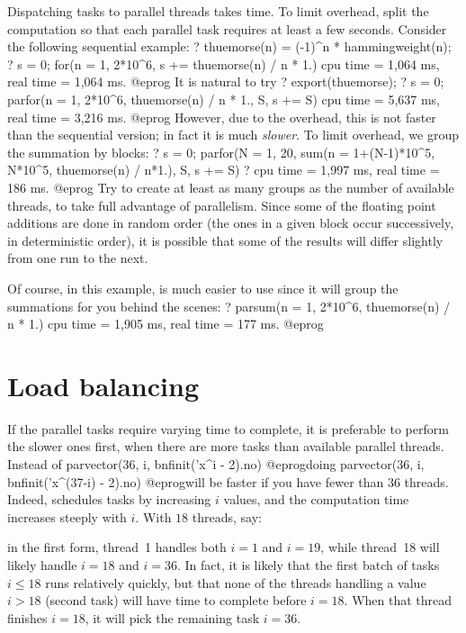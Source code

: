 Dispatching tasks to parallel threads takes time. To limit overhead, split
the computation so that each parallel task requires at least a few
seconds. Consider the following sequential example:
\bprog
  ? thuemorse(n) = (-1)^n * hammingweight(n);
  ? s = 0; for(n = 1, 2*10^6, s += thuemorse(n) / n * 1.)
  cpu time = 1,064 ms, real time = 1,064 ms.
@eprog\noindent
It is natural to try
\bprog
  ? export(thuemorse);
  ? s = 0; parfor(n = 1, 2*10^6, thuemorse(n) / n * 1., S, s += S)
  cpu time = 5,637 ms, real time = 3,216 ms.
@eprog\noindent
However, due to the overhead, this is not faster than the sequential
version; in fact it is much \emph{slower}. To limit overhead, we group
the summation by blocks:
\bprog
  ? s = 0; parfor(N = 1, 20, sum(n = 1+(N-1)*10^5, N*10^5,
                                 thuemorse(n) / n*1.), S, s += S)
  ? cpu time = 1,997 ms, real time = 186 ms.
@eprog\noindent
Try to create at least as many groups as the number of available threads,
to take full advantage of parallelism. Since some of the floating point
additions are done in random order (the ones in a given block occur
successively, in deterministic order), it is possible that some of the
results will differ slightly from one run to the next.

Of course, in this example,  is much easier to use since it will
group the summations for you behind the scenes:
\bprog
  ? parsum(n = 1, 2*10^6, thuemorse(n) / n * 1.)
  cpu time = 1,905 ms, real time = 177 ms.
@eprog

\section{Load balancing}

If the parallel tasks require varying time to complete, it is preferable to
perform the slower ones first, when there are more tasks than available
parallel threads. Instead of
\bprog
  parvector(36, i, bnfinit('x^i - 2).no)
@eprog\noindent doing
\bprog
  parvector(36, i, bnfinit('x^(37-i) - 2).no)
@eprog\noindent will be faster if you have fewer than $36$ threads.
Indeed,  schedules tasks by increasing $i$ values, and the
computation time increases steeply with $i$. With $18$ threads, say:

\item in the first form, thread~1 handles both $i = 1$ and $i = 19$,
  while thread~18 will likely handle $i = 18$ and $i = 36$. In fact, it is
  likely that the first batch of tasks $i\leq 18$ runs relatively quickly,
  but that none of the threads  handling a value $i > 18$ (second task) will
  have time to complete before $i = 18$. When that thread finishes
  $i = 18$, it will pick the remaining task $i = 36$.

